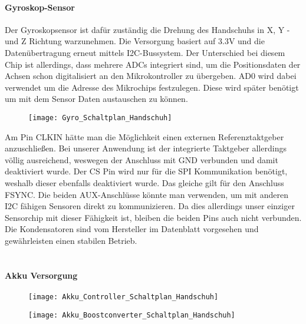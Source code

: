 \documentclass[titlepage,12pt,twoside]{article}
\begin{document}
\paragraph{Gyroskop-Sensor}
\hfill \break
\hfill \break
Der Gyroskopsensor ist dafür zuständig die Drehung des Handschuhs in X, Y -und Z Richtung warzunehmen. Die Versorgung basiert 
auf 3.3V und die Datenübertragung erneut mittels I2C-Bussystem. Der Unterschied bei diesem Chip ist allerdings, dass mehrere ADCs
integriert sind, um die Positionsdaten der Achsen schon digitalisiert an den Mikrokontroller zu übergeben. AD0 wird dabei verwendet
um die Adresse des Mikrochips festzulegen. Diese wird später benötigt um mit dem Sensor Daten austauschen zu können.
\\
\begin{figure}[H]
	\begin{center}
		\scalebox{0.5}
		{\texttt{[image: Gyro\_Schaltplan\_Handschuh]}}
	\end{center}
\end{figure}
\hfill \break
Am Pin CLKIN hätte man die Möglichkeit einen externen Referenztaktgeber anzuschließen. Bei unserer Anwendung ist der integrierte 
Taktgeber allerdings völlig ausreichend, weswegen der Anschluss mit GND verbunden und damit deaktiviert wurde. Der CS Pin wird nur
für die SPI Kommunikation benötigt, weshalb dieser ebenfalls deaktiviert wurde. Das gleiche gilt für den Anschluss FSYNC. Die beiden
AUX-Anschlüsse könnte man verwenden, um mit anderen I2C fähigen Sensoren direkt zu kommunizieren. Da dies allerdings unser einziger
Sensorchip mit dieser Fähigkeit ist, bleiben die beiden Pins auch nicht verbunden. Die Kondensatoren sind vom Hersteller im Datenblatt
vorgesehen und gewährleisten einen stabilen Betrieb. \\
\\
\paragraph{Akku Versorgung}
\hfill \break
\hfill \break
\begin{figure}[H]
	\begin{center}
		\scalebox{0.5}
		{\texttt{[image: Akku\_Controller\_Schaltplan\_Handschuh]}}
	\end{center}
\end{figure}

\begin{figure}[H]
	\begin{center}
		\scalebox{0.5}
		{\texttt{[image: Akku\_Boostconverter\_Schaltplan\_Handschuh]}}
	\end{center}
\end{figure}
\end{document}
